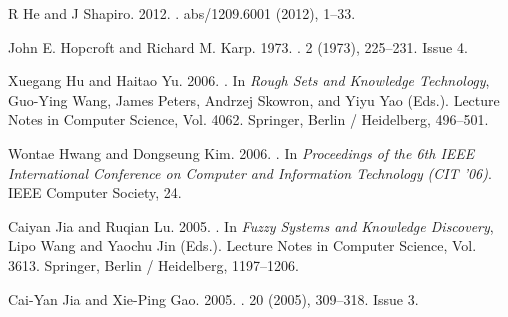 \begin{thebibliography}{00}
  {R He} {and} {J Shapiro}. 2012.
  \newblock {}. 
   abs/1209.6001 (2012), 1--33.


{John E. Hopcroft} {and} {Richard M. Karp}. 1973.
\newblock {}.
  {2} (1973),
  225--231.
\newblock
Issue 4.

{Xuegang Hu} {and} {Haitao Yu}. 2006.
\newblock {}.
\newblock In {\em Rough Sets and Knowledge Technology}, {Guo-Ying Wang}, {James
  Peters}, {Andrzej Skowron}, {and} {Yiyu Yao} (Eds.). Lecture Notes in
  Computer Science, Vol. 4062. Springer, Berlin / Heidelberg, 496--501.
\newblock
{}


{Wontae Hwang} {and} {Dongseung Kim}. 2006.
\newblock {}. In {\em Proceedings of the 6th IEEE International Conference on
  Computer and Information Technology} {\em (CIT '06)}. IEEE Computer Society,
  24.
\newblock
{}


{Caiyan Jia} {and} {Ruqian Lu}. 2005.
\newblock {}.
\newblock In {\em Fuzzy Systems and Knowledge Discovery}, {Lipo Wang} {and}
  {Yaochu Jin} (Eds.). Lecture Notes in Computer Science, Vol. 3613. Springer,
  Berlin / Heidelberg, 1197--1206.
\newblock
{}


{Cai-Yan Jia} {and} {Xie-Ping Gao}. 2005.
\newblock {}.
  {20} (2005),
  309--318.
\newblock
Issue 3.



\end{thebibliography}

